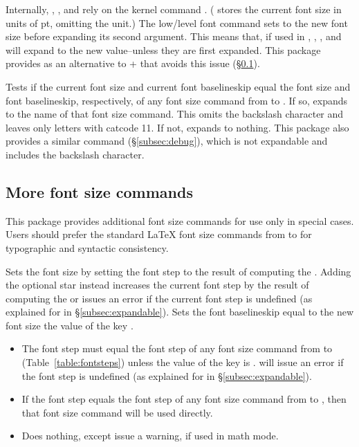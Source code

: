 \documentclass{beery}
\begin{document}
Internally, , , and  rely on the kernel command .
( stores the current font size in units of \unit{pt}, omitting the unit.)
The low\-/level font command  sets  to the new font size before expanding its second argument.
This means that, if used in , , , and  will expand to the new value\---unless they are first expanded.
This package provides  as an alternative to  +  that avoids this issue (\S\ref{subsec:fontsize}).

\KeepNextPar*

Tests if the current font size and current font baselineskip equal the font size and font baselineskip, respectively, of any font size command from  to .
If so, expands to the name of that font size command.
This omits the backslash character and leaves only letters with catcode \num{11}.
If not, expands to nothing.
This package also provides a similar command  (\S\ref{subsec:debug}), which is not expandable and includes the backslash character.

\subsection{More font size commands}
\label{subsec:fontsize}

This package provides additional font size commands for use only in special cases.
Users should prefer the standard \LaTeX{} font size commands from  to  for typographic and syntactic consistency.

 \sarg{} 
\KeepNextPar*

Sets the font size by setting the font step to the result of computing the .
Adding the optional star instead increases the current font step by the result of computing the  or issues an error if the current font step is undefined (as explained for  in \S\ref{subsec:expandable}).
Sets the font baselineskip equal to the new font size \texttimes{} the value of the key .

\begin{itemize}
  \item
  The font step must equal the font step of any font size command from  to  (Table~\ref{table:fontsteps}) unless the value of the key  is .
   will issue an error if the font step is undefined (as explained for  in \S\ref{subsec:expandable}).
  \item
  If the font step equals the font step of any font size command from  to , then that font size command will be used directly.
  \item
  Does nothing, except issue a warning, if used in math mode.
\end{itemize}
\end{document}
